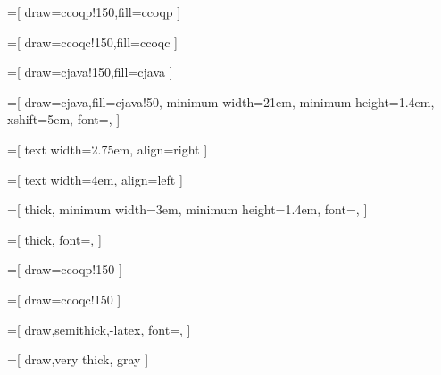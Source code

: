 

=[
 draw=ccoqp!150,fill=ccoqp
]

=[
 draw=ccoqc!150,fill=ccoqc
]

=[
 draw=cjava!150,fill=cjava
]

=[
 draw=cjava,fill=cjava!50,
 minimum width=21em,
 minimum height=1.4em,
 xshift=5em,
 font=\scriptsize\sffamily,
]

=[
 text width=2.75em,
 align=right
]

=[
 text width=4em,
 align=left
]

=[
 thick,
 minimum width=3em,
 minimum height=1.4em,
 font=\scriptsize\sffamily,
]

=[
 thick,
 font=\scriptsize\sffamily,
]

=[
 draw=ccoqp!150
]

=[
 draw=ccoqc!150
]

=[
 draw,semithick,-latex,
 font=\scriptsize\sffamily,
]

=[
 draw,very thick, gray
]

\newcommand{\tikzoptim}[3][]{
   \path[trans, draw=#1!150, fill=#1!150] (#2) edge [looseness=10, loop above]
       node [pos=0.5](#2-optim) {}
       node [yshift = 0.5em,below] {\href{#3}{\phantom{XXX}} \\ \href{#3}{\phantom{XXX}}} ();
}
\newcommand{\tikzoptimdotted}[3][]{
   \path[trans, draw=#1!150, fill=#1!150] (#2) edge [looseness=10, loop above, dotted]
       node [pos=0.5](#2-optim) {}
       node [yshift = 0.5em,below] {\href{#3}{\phantom{XXX}} \\ \href{#3}{\phantom{XXX}}} ();
}

\newcommand{\transref}[2]{
   \foreach \i in {0,...,#1} { node [pos=\i/#1, circle] {\href{#2}{\phantom{X}}}}
}

\newcommand{\transocamljava}[1]{
 \path[draw,thick,latex-latex, densely dotted,
      shorten >=0.2em, shorten <=0.2em,
       java] ([xshift=-0.75em] #1.south) -- ([xshift=-0.75em] #1-java.north);
}

